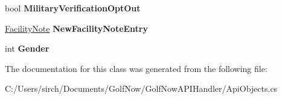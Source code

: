 \begin{DoxyCompactItemize}
bool {\bfseries Military\+Verification\+Opt\+Out}
\item 
\mbox{\label{class_golf_now_a_p_i_1_1_customer_profile_new_a6e5a5c3404b6c005b68dc55c66659ce6}} 
\mbox{\hyperlink{class_golf_now_a_p_i_1_1_facility_note}{Facility\+Note}} {\bfseries New\+Facility\+Note\+Entry}
\item 
\mbox{\label{class_golf_now_a_p_i_1_1_customer_profile_new_a3bab700e49b091142d65f08bf5a46135}} 
int {\bfseries Gender}
\end{DoxyCompactItemize}


The documentation for this class was generated from the following file\+:\begin{DoxyCompactItemize}
\item 
C\+:/\+Users/sirch/\+Documents/\+Golf\+Now/\+Golf\+Now\+A\+P\+I\+Handler/Api\+Objects.\+cs\end{DoxyCompactItemize}

